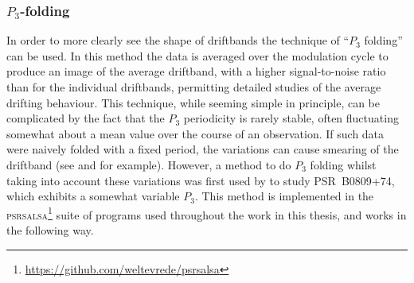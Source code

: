 \subsubsection{$P_3$-folding}
\label{sec: intro - emission models - single pulse phenomena - P3 folding}


In order to more clearly see the shape of driftbands the technique of ``$P_3$ folding'' can be used. In this method the data is averaged over the modulation cycle to produce an image of the average driftband, with a higher signal-to-noise ratio than for the individual driftbands, permitting detailed studies of the average drifting behaviour. This technique, while seeming simple in principle, can be complicated by the fact that the $P_3$ periodicity is rarely stable, often fluctuating somewhat about a mean value over the course of an observation. If such data were naively folded with a fixed period, the variations can cause smearing of the driftband (see \citealt{DRxx2001} and \citealt{LKR+2002} for example). However, a method to do $P_3$ folding whilst taking into account these variations was first used by \citet{HSW+2013} to study PSR~B0809+74, which exhibits a somewhat variable $P_3$. This method is implemented in the \textsc{psrsalsa}\footnote{\url{https://github.com/weltevrede/psrsalsa}} suite of programs \citep{Wxxx2016} used throughout the work in this thesis, and works in the following way.

